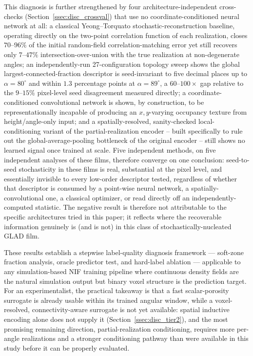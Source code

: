 \documentclass[aip,amsmath,amssymb,reprint]{revtex4-1}
\renewcommand{\ang}{\ensuremath{\alpha}} %
\newcommand{\nif}{\textsc{NIF}}
\begin{document}
This diagnosis is further strengthened by four architecture-independent
cross-checks (Section~\ref{ssec:disc_crossval}) that use no
coordinate-conditioned neural network at all: a classical Yeong--Torquato
stochastic-reconstruction baseline, operating directly on the two-point
correlation function of each realization, closes $70$--$96\%$ of the
initial random-field correlation-matching error yet still recovers only
$7$--$47\%$ intersection-over-union with the true realization at
non-degenerate angles; an independently-run 27-configuration topology
sweep shows the global largest-connected-fraction descriptor is
seed-invariant to five decimal places up to $\ang=80^{\circ}$ and within
$1.3$ percentage points at $\ang=89^{\circ}$, a $60$--$100\times$ gap
relative to the $9$--$15\%$ pixel-level seed disagreement measured
directly; a coordinate-conditioned convolutional network is shown, by
construction, to be representationally incapable of producing an
$x,y$-varying occupancy texture from height/angle-only input; and a
spatially-resolved, sanity-checked local-conditioning variant of the
partial-realization encoder -- built specifically to rule out the
global-average-pooling bottleneck of the original encoder -- still shows
no learned signal once trained at scale. Five independent methods, on
five independent analyses of these films, therefore converge on one
conclusion: seed-to-seed stochasticity in these films is real,
substantial at the pixel level, and essentially invisible to every
low-order descriptor tested, regardless of whether that descriptor is
consumed by a point-wise neural network, a spatially-convolutional one, a
classical optimizer, or read directly off an independently-computed
statistic. The negative result is therefore not attributable to the
specific architectures tried in this paper; it reflects where the
recoverable information genuinely is (and is not) in this class of
stochastically-nucleated GLAD film.

These results establish a stepwise label-quality diagnosis
framework — soft-zone fraction analysis, oracle predictor test,
and hard-label ablation — applicable to any simulation-based
\nif{} training pipeline where continuous density fields are the
natural simulation output but binary voxel structure is the
prediction target. For an experimentalist, the practical takeaway
is that a fast scalar-porosity surrogate is already usable within
its trained angular window, while a voxel-resolved,
connectivity-aware surrogate is not yet available: spatial inductive
encoding alone does not supply it (Section~\ref{ssec:disc_tier2}), and
the most promising remaining direction, partial-realization
conditioning, requires more per-angle realizations and a stronger
conditioning pathway than were available in this study before it can
be properly evaluated.
\end{document}
